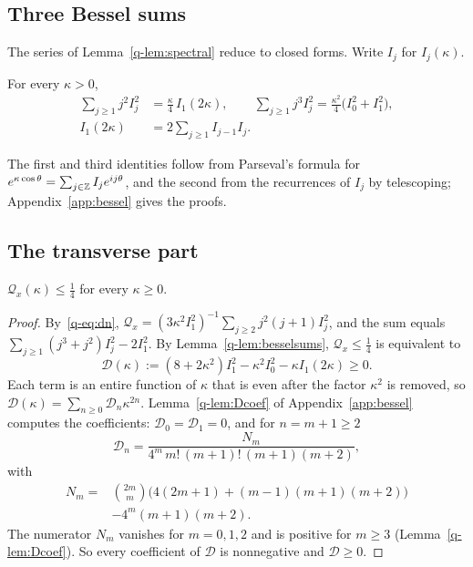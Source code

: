 \subsection{Three Bessel sums}

The series of Lemma~\ref{q-lem:spectral} reduce to closed forms. Write $I_j$
for $I_j(\kappa)$.

\begin{lemma}\label{q-lem:besselsums}
For every $\kappa>0$,
\begin{align*}
\sum_{j\ge1}j^2I_j^2&=\frac\kappa4\,I_1(2\kappa),\qquad
\sum_{j\ge1}j^3I_j^2=\frac{\kappa^2}4\bigl(I_0^2+I_1^2\bigr),\\
I_1(2\kappa)&=2\sum_{j\ge1}I_{j-1}I_j .
\end{align*}
\end{lemma}

The first and third identities follow from Parseval's formula for
$e^{\kappa\cos\theta}=\sum_{j\in\mathbb{Z}}I_je^{ij\theta}$, and the second from the
recurrences of $I_j$ by telescoping; Appendix~\ref{app:bessel} gives the
proofs.

\subsection{The transverse part}

\begin{proposition}\label{q-prop:transverse}
$\mathcal Q_x(\kappa)\le\frac14$ for every $\kappa\ge0$.
\end{proposition}

\begin{proof}
By~\eqref{q-eq:dn}, $\mathcal Q_x=(3\kappa^2I_1^2)^{-1}\sum_{j\ge2}j^2(j+1)
I_j^2$, and the sum equals $\sum_{j\ge1}(j^3+j^2)I_j^2-2I_1^2$. By
Lemma~\ref{q-lem:besselsums}, $\mathcal Q_x\le\frac14$ is equivalent to
\begin{equation}\label{q-eq:Dfunction}
\mathcal D(\kappa):=(8+2\kappa^2)I_1^2-\kappa^2I_0^2-\kappa I_1(2\kappa)\ge0 .
\end{equation}
Each term is an entire function of $\kappa$ that is even after the
factor $\kappa^2$ is removed, so $\mathcal D(\kappa)=\sum_{n\ge0}\mathcal D_n
\kappa^{2n}$. Lemma~\ref{q-lem:Dcoef} of Appendix~\ref{app:bessel} computes the
coefficients: $\mathcal D_0=\mathcal D_1=0$, and for $n=m+1\ge2$
\[
\mathcal D_n=\frac{N_m}{4^m\,m!\,(m+1)!\,(m+1)(m+2)},
\]
with
\[
\begin{aligned}
N_m={}&\binom{2m}m\bigl(4(2m+1)+(m-1)(m+1)(m+2)\bigr)\\
&-4^m(m+1)(m+2).
\end{aligned}
\]
The numerator $N_m$ vanishes for $m=0,1,2$ and is positive for $m\ge3$
(Lemma~\ref{q-lem:Dcoef}). So every coefficient of $\mathcal D$ is nonnegative
and $\mathcal D\ge0$.
\end{proof}

